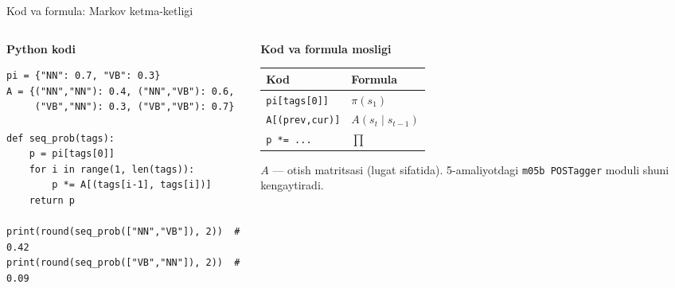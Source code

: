 \documentclass[aspectratio=169,11pt]{beamer}
\newcommand{\uzq}{\textquotesingle{}}
\begin{document}
\begin{frame}[fragile]{Kod va formula: Markov ketma-ketligi}
\scriptsize

\begin{columns}[T,totalwidth=\textwidth]
\begin{column}{0.60\textwidth}
\textbf{Python kodi}

\begin{tcolorbox}[defbox,left=2mm,right=2mm,top=1mm,bottom=1mm]
\begin{verbatim}
pi = {"NN": 0.7, "VB": 0.3}
A = {("NN","NN"): 0.4, ("NN","VB"): 0.6,
     ("VB","NN"): 0.3, ("VB","VB"): 0.7}

def seq_prob(tags):
    p = pi[tags[0]]
    for i in range(1, len(tags)):
        p *= A[(tags[i-1], tags[i])]
    return p

print(round(seq_prob(["NN","VB"]), 2))  # 0.42
print(round(seq_prob(["VB","NN"]), 2))  # 0.09
\end{verbatim}
\end{tcolorbox}
\end{column}

\begin{column}{0.38\textwidth}
\textbf{Kod va formula mosligi}

\begin{tabular}{@{}l l@{}}
\toprule
\textbf{Kod} & \textbf{Formula} \\
\midrule
\texttt{pi[tags[0]]}    & $\pi(s_1)$ \\
\texttt{A[(prev,cur)]}  & $A(s_t\mid s_{t-1})$ \\
\texttt{p *= ...}       & $\prod$ \\
\bottomrule
\end{tabular}

\vspace{6pt}
\begin{tcolorbox}[defbox,left=2mm,right=2mm,top=1mm,bottom=1mm]
\scriptsize
$A$ --- o\uzq{}tish matritsasi (lug\uzq{}at sifatida). 5-amaliyotdagi
\texttt{m05b POSTagger} moduli shuni kengaytiradi.
\end{tcolorbox}
\end{column}
\end{columns}

\end{frame}
\end{document}

